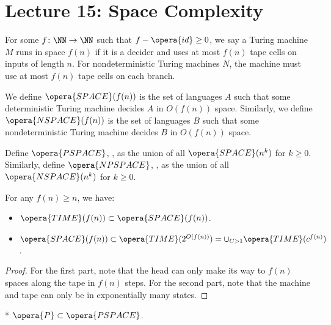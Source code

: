 \section*{Lecture 15: Space Complexity}
\setcounter{section}{15}

\begin{defn}
	For some $f\colon \NN \to \NN$ such that $f-\opera{id} \geq 0$, we say a Turing machine $M$ runs in space $f(n)$ if it is a decider and uses at most $f(n)$ tape cells on inputs of length $n$.  
	For nondeterministic Turing machines $N$, the machine must use at most $f(n)$ tape cells on each branch.
\end{defn}

\begin{defn}
	We define $\opera{SPACE}(f(n))$ is the set of languages $A$ such that some deterministic Turing machine decides $A$ in $O(f(n))$ space.
	Similarly, we define $\opera{NSPACE}(f(n))$ is the set of languages $B$ such that some nondeterministic Turing machine decides $B$ in $O(f(n))$ space.
\end{defn}

\begin{defn}
	Define $\opera{PSPACE}$, , as the union of all $\opera{SPACE}(n^k)$ for $k \geq 0$. Similarly, define $\opera{NPSPACE}$, , as the union of all $\opera{NSPACE}(n^k)$ for $k \geq 0$.
\end{defn}

\begin{thm}
	For any $f(n) \geq n$, we have:
	\begin{itemize}
		\item $\opera{TIME}(f(n)) \subset \opera{SPACE}(f(n))$.
		\item $\opera{SPACE}(f(n)) \subset \opera{TIME}(2^{O(f(n))}) = \cup_{C > 1} \opera{TIME}(c^{f(n)})$.
	\end{itemize}
\end{thm}

\begin{proof}
	For the first part, note that the head can only make its way to $f(n)$ spaces along the tape in $f(n)$ steps.
	For the second part, note that the machine and tape can only be in exponentially many states.
\end{proof}

\begin{cor}*
	$\opera{P} \subset \opera{PSPACE}$.
\end{cor}

